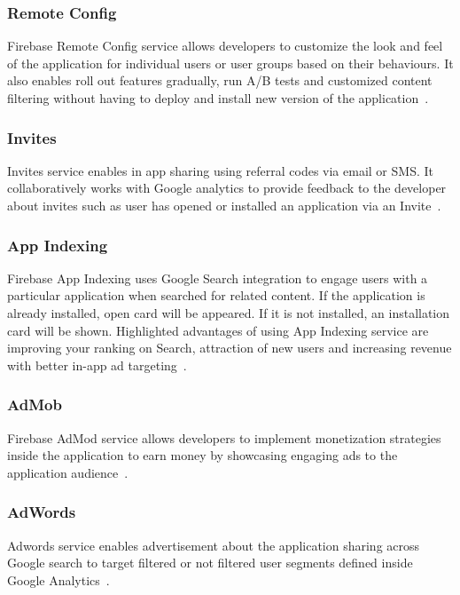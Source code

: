 \subsubsection{Remote Config} Firebase Remote Config service allows developers
to customize the look and feel of the application for individual users or user
groups based on their behaviours. It also enables roll out features gradually,
run A/B tests and customized content filtering without having to deploy and
install new version of the
application~\cite{hid-sp18-409-www-firebase-products}.

\subsubsection{Invites} Invites service enables in app sharing using referral
codes via email or SMS. It collaboratively works with Google analytics to
provide feedback to the developer about invites such as user has opened or
installed an application via an Invite~\cite{hid-sp18-409-www-firebase-products,
	hid-sp18-409-www-firebase-invite}.

\subsubsection{App Indexing} Firebase App Indexing uses Google Search
integration to engage users with a particular application when searched for
related content. If the application is already installed, open card will be
appeared. If it is not installed, an installation card will be shown.
Highlighted advantages of using App Indexing service are improving your ranking
on Search, attraction of new users and increasing revenue with better in-app ad
targeting~\cite{hid-sp18-409-www-firebase-products}.

\subsubsection{AdMob} Firebase AdMod service allows developers to implement
monetization strategies inside the application to earn money by showcasing
engaging ads to the application audience~\cite{hid-sp18-409-www-firebase-admob}.

\subsubsection{AdWords} Adwords service enables advertisement about the
application  sharing across Google search to target filtered or not filtered
user segments defined inside Google
Analytics~\cite{hid-sp18-409-www-firebase-adwords}.


